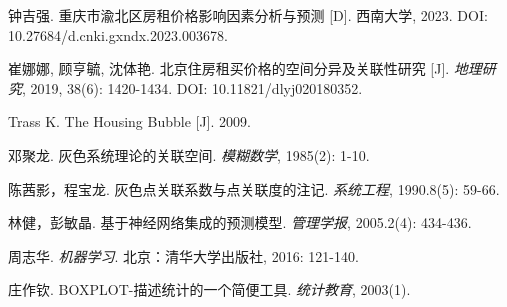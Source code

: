 \documentclass[12pt]{article}
\begin{document}
\begin{CJK}{UTF8}{gbsn}
\begin{thebibliography}{99}
			 钟吉强. 重庆市渝北区房租价格影响因素分析与预测 [D]. 西南大学, 2023. DOI: 10.27684/d.cnki.gxndx.2023.003678.
			
			 崔娜娜, 顾亨毓, 沈体艳. 北京住房租买价格的空间分异及关联性研究 [J]. \textit{地理研究}, 2019, 38(6): 1420-1434. DOI: 10.11821/dlyj020180352.
			
			 Trass K. The Housing Bubble [J]. 2009.
			
			 邓聚龙. 灰色系统理论的关联空间. \textit{模糊数学}, 1985(2): 1-10.
			
			 陈茜影，程宝龙. 灰色点关联系数与点关联度的注记. \textit{系统工程}, 1990.8(5): 59-66.
			
			 林健，彭敏晶. 基于神经网络集成的预测模型. \textit{管理学报}, 2005.2(4): 434-436.
			
			 周志华. \textit{机器学习}. 北京：清华大学出版社, 2016: 121-140.
			
			 庄作钦. BOXPLOT-描述统计的一个简便工具. \textit{统计教育}, 2003(1).
			
		\end{thebibliography}
		
		
		
		
	\end{CJK}
\end{document}
